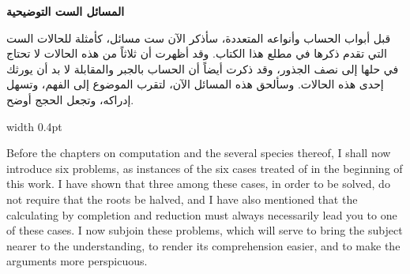 \documentclass[11pt,a4paper,openany,oneside]{book}
\begin{document}
\noindent\begin{minipage}[t]{0.48\textwidth}
\raggedleft

\begin{Arabic}
\textbf{المسائل الست التوضيحية}

قبل أبواب الحساب وأنواعه المتعددة، سأذكر الآن ست مسائل، كأمثلة للحالات الست التي تقدم ذكرها في مطلع هذا الكتاب. وقد أظهرت أن ثلاثاً من هذه الحالات لا تحتاج في حلها إلى نصف الجذور، وقد ذكرت أيضاً أن الحساب بالجبر والمقابلة لا بد أن يورثك إحدى هذه الحالات. وسألحق هذه المسائل الآن، لتقرب الموضوع إلى الفهم، وتسهل إدراكه، وتجعل الحجج أوضح.
\end{Arabic}

\end{minipage}%
\hfill\vrule width 0.4pt\hfill
\begin{minipage}[t]{0.48\textwidth}
\raggedright

Before the chapters on computation and the several species thereof, I shall now introduce six problems, as instances of the six cases treated of in the beginning of this work. I have shown that three among these cases, in order to be solved, do not require that the roots be halved, and I have also mentioned that the calculating by completion and reduction must always necessarily lead you to one of these cases. I now subjoin these problems, which will serve to bring the subject nearer to the understanding, to render its comprehension easier, and to make the arguments more perspicuous.

\end{minipage}
\vspace{0.3cm}

\vspace{0.5cm}
\end{document}
